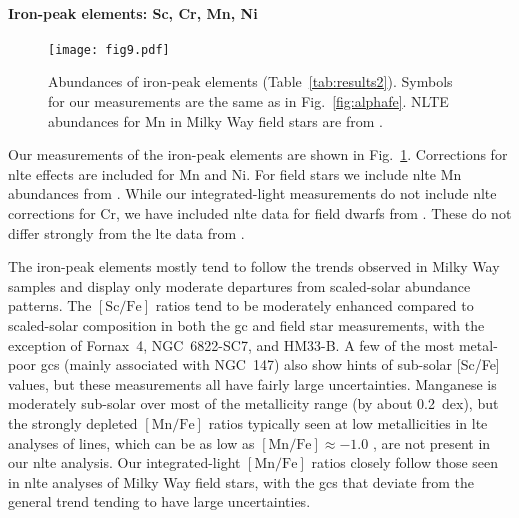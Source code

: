 \documentclass{aa}
\begin{document}
\paragraph{Iron-peak elements: Sc, Cr, Mn, Ni}

\begin{figure}
\centering
\texttt{[image: fig9.pdf]}
\caption{\label{fig:fepeak}Abundances of iron-peak elements (Table~\ref{tab:results2}). Symbols for our measurements are the same as in Fig.~\ref{fig:alphafe}. NLTE abundances for Mn in Milky Way field stars are from \citet{Eitner2020}.}
\end{figure}

Our measurements of the iron-peak elements are shown in Fig.~\ref{fig:fepeak}. Corrections for \ac{nlte} effects are included for Mn and Ni. For field stars we include \ac{nlte} Mn abundances from \citet{Eitner2019}. While our integrated-light measurements do not include \ac{nlte} corrections for Cr, we have included \ac{nlte} data for field dwarfs from \citet{Bergemann2010}. These do not differ strongly from the \ac{lte} data from . 

The iron-peak elements mostly tend to follow the trends observed in Milky Way samples and display only moderate departures from scaled-solar abundance patterns.  
The $\mathrm{[Sc/Fe]}$ ratios tend to be moderately enhanced compared to scaled-solar composition in both the \ac{gc} and field star measurements, with the exception of Fornax~4, NGC~6822-SC7, and HM33-B. A few of the most metal-poor \acp{gc} (mainly associated with NGC~147) also show hints of sub-solar [Sc/Fe] values, but these measurements all have fairly large uncertainties.
Manganese is moderately sub-solar over most of the metallicity range (by about 0.2~dex), but the strongly depleted $\mathrm{[Mn/Fe]}$ ratios typically seen at low metallicities in \ac{lte} analyses of  lines, which can be as low as $\mathrm{[Mn/Fe]} \approx -1.0$ \citep{Bonifacio2009}, are not present in our \ac{nlte} analysis. Our integrated-light $\mathrm{[Mn/Fe]}$ ratios closely follow those seen in \ac{nlte} analyses of Milky Way field stars, with the \acp{gc} that deviate from the general trend tending to have large uncertainties. 
\end{document}
